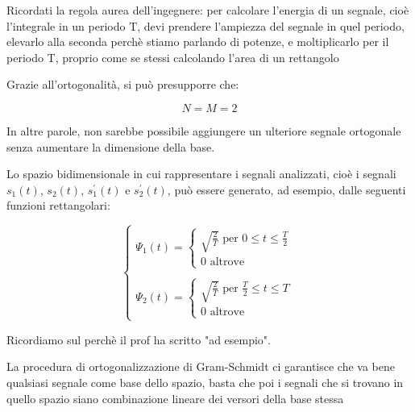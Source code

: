 \begin{tcolorbox}
    Ricordati la regola aurea dell'ingegnere: per calcolare l'energia di un segnale, 
    cioè l'integrale in un periodo T, devi prendere l'ampiezza del segnale in quel periodo, elevarlo alla seconda perchè stiamo parlando di potenze, 
    e moltiplicarlo per il periodo T, proprio come se stessi calcolando l'area di un rettangolo 
\end{tcolorbox}

Grazie all'ortogonalità, 
si può presupporre che: 

{
    \Large 
    \begin{equation}
        N = M = 2
    \end{equation}
}

In altre parole, non sarebbe possibile aggiungere un ulteriore segnale ortogonale senza aumentare la dimensione della base. \newline 

Lo spazio bidimensionale in cui rappresentare i segnali analizzati, 
cioè i segnali $s_1 (t)$, $s_2 (t)$, $s_1^{'} (t)$ e $s_2^{'} (t)$, 
può essere generato, ad esempio, dalle seguenti funzioni rettangolari: 

{
    \Large 
    \begin{equation}
        \begin{cases}
            \Psi_1 (t)
            = 
            \begin{cases}
                \sqrt{\frac{2}{T}} \text{ per } 0 \le t \le \frac{T}{2}
                \\
                0 \text{ altrove}
            \end{cases}
            \\
            \quad
            \\
            \Psi_2 (t)
             = 
            \begin{cases}
                \sqrt{\frac{2}{T}} \text{ per } \frac{T}{2} \le t \le T
                \\
                0 \text{ altrove}
            \end{cases}
        \end{cases}
    \end{equation}
}

\begin{tcolorbox}
    Ricordiamo sul perchè il prof ha scritto "ad esempio". \newline 

    La procedura di ortogonalizzazione di Gram-Schmidt ci garantisce che va bene qualsiasi segnale come base dello spazio, 
    basta che poi i segnali che si trovano in quello spazio siano combinazione lineare dei versori della base stessa
\end{tcolorbox}

